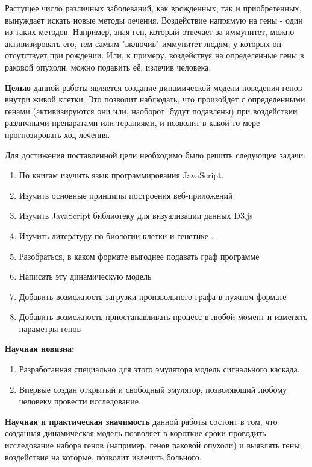 
\setcounter{page}{5}

Растущее число различных заболеваний, как врожденных, так и приобретенных, вынуждает искать новые методы лечения. Воздействие напрямую на гены - один из таких методов. Например, зная ген, который отвечает за иммунитет, можно активизировать его, тем самым "включив" иммунитет людям, у которых он отсутствует при рождении. Или, к примеру, воздействуя на определенные гены в раковой опухоли, можно подавить её, излечив человека.

\textbf{Целью} данной работы является создание динамической модели поведения генов внутри живой клетки. Это позволит наблюдать, что произойдет с определенными генами (активизируются они или, наоборот, будут подавлены) при воздействии различными препаратами или терапиями, и позволит в какой-то мере прогнозировать ход лечения.

Для достижения поставленной цели необходимо было решить следующие задачи:
\begin{enumerate}
  \item По книгам \cite{bib1, bib2} изучить язык программирования JavaScript.
  \item Изучить основные принципы построения веб-приложений.
  \item Изучить JavaScript библиотеку для визуализации данных D3.js
  \item Изучить литературу по биологии клетки и генетике \cite{bib3, bib4, bib5}.
  \item Разобраться, в каком формате выгоднее подавать граф программе
  \item Написать эту динамическую модель
  \item Добавить возможность загрузки произвольного графа в нужном формате
  \item Добавить возможность приостанавливать процесс в любой момент и изменять параметры генов
\end{enumerate}

\textbf{Научная новизна:}
\begin{enumerate}
  \item Разработанная специально для этого эмулятора модель сигнального каскада.
  \item Впервые создан открытый и свободный эмулятор, позволяющий любому человеку провести исследование.
\end{enumerate}

\textbf{Научная и практическая значимость} данной работы состоит в том, что созданная динамическая модель позволяет в короткие сроки проводить исследование набора генов (например, генов раковой опухоли) и выявлять гены, воздействие на которые, позволит излечить больного.

